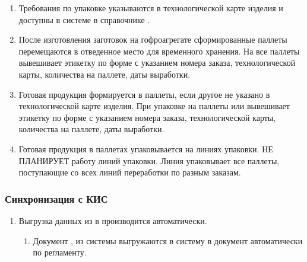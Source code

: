 \begin{enumerate}

\item	Требования по упаковке указываются в технологической карте изделия и доступны в системе \gofro в справочнике .
\item	После изготовления заготовок на гофроагрегате сформированные паллеты перемещаются в отведенное место для временного хранения. На все паллеты \gaoperator вывешивает этикетку по форме  с указанием номера заказа, технологической карты, количества на паллете, даты выработки.
\item	Готовая продукция формируется в паллеты, если другое не указано в технологической карте изделия. При упаковке на паллеты \gaoperator или \operator  вывешивает этикетку по форме  с указанием номера заказа, технологической карты, количества на паллете, даты выработки. 
\item	Готовая продукция в паллетах упаковывается на линиях упаковки. \planner НЕ ПЛАНИРУЕТ работу линий упаковки. Линия упаковывает все паллеты, поступающие со всех линий переработки по разным заказам. 
\end{enumerate}








\subsubsection{Синхронизация с КИС}
\label{bp:production_exchange}

\begin{enumerate}
\item	Выгрузка данных из \gofro в \erp производится автоматически.

\begin{enumerate}

\item	Документ ,  из системы \gofro выгружаются в систему \erp в документ  автоматически по регламенту.

\end{enumerate}

\end{enumerate}